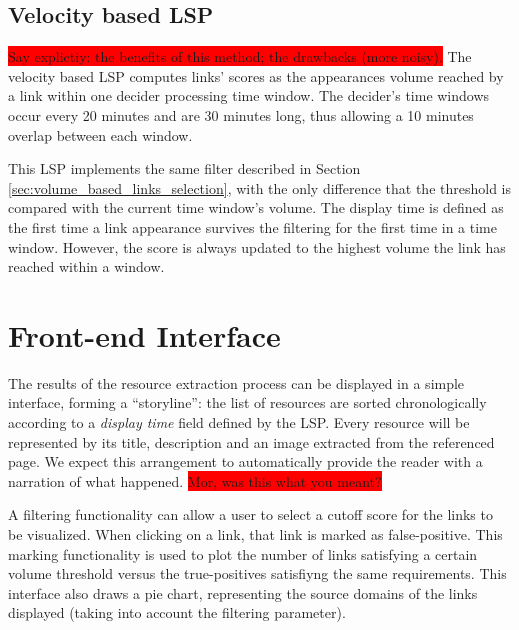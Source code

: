 \documentclass{sig-alternate}
\newcommand{\todo}[1]{\colorbox{red}{#1}}
\begin{document}
\subsection{Velocity based LSP}
\label{sec:velocity_based_links_selection}
\todo{Say explictiy: the benefits of this method; the drawbacks (more noisy).}
The velocity based LSP computes links' scores as the appearances volume reached by a link within one decider processing time window. The decider's time windows occur every 20 minutes and are 30 minutes long, thus allowing a 10 minutes overlap between each window.

This LSP implements the same filter described in Section \ref{sec:volume_based_links_selection}, with the only difference that the threshold is compared with the current time window's volume. The display time is defined as the first time a link appearance survives the filtering for the first time in a time window. However, the score is always updated to the highest volume the link has reached within a window.

\section{Front-end Interface}
\label{sec:front-end-interface}
The results of the resource extraction process can be displayed in a simple interface, forming a ``storyline'': the list of resources are sorted chronologically according to a \emph{display time} field defined by the LSP. Every resource will be represented by its title, description and an image extracted from the referenced page. We expect this arrangement to automatically provide the reader with a narration of what happened. \todo{Mor, was this what you meant?}

A filtering functionality can allow a user to select a cutoff score for the links to be visualized. When clicking on a link, that link is marked as false-positive. This marking functionality is used to plot the number of links satisfying a certain volume threshold versus the true-positives satisfiyng the same requirements. This interface also draws a pie chart, representing the source domains of the links displayed (taking into account the filtering parameter).
\end{document}
